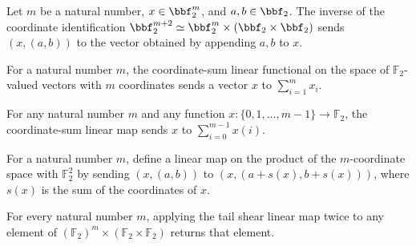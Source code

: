 \begin{theorem}
\label{FABL.splitLastTwoLinearEquiv_symm_apply}
\leanok
{}
Let $m$ be a natural number, $x\in\bbf_2^m$, and $a,b\in\bbf_2$. The inverse of the
coordinate identification $\bbf_2^{m+2}\simeq\bbf_2^m\times(\bbf_2\times\bbf_2)$ sends
$(x,(a,b))$ to the vector obtained by appending $a,b$ to $x$.
\end{theorem}

\begin{definition}
\label{FABL.coordinateSumLinearMap}
\leanok
{}
For a natural number $m$, the coordinate-sum linear functional on the space of
$\mathbb{F}_2$-valued vectors with $m$ coordinates sends a vector $x$ to
$\sum_{i=1}^{m}x_i$.
\end{definition}

\begin{theorem}
\label{FABL.coordinateSumLinearMap_apply}
\leanok
{}
For any natural number $m$ and any function $x : \{0,1,\ldots,m-1\} \to
\mathbb{F}_2$, the coordinate-sum linear map sends $x$ to $\sum_{i=0}^{m-1} x(i)$.
\end{theorem}

\begin{definition}
\label{FABL.tailShearLinearMap}
\leanok
{}
For a natural number $m$, define a linear map on the product of the $m$-coordinate space
with $\mathbb{F}_2^2$ by sending $(x,(a,b))$ to $(x,(a+s(x),b+s(x)))$, where $s(x)$ is
the sum of the coordinates of $x$.
\end{definition}

\begin{theorem}
\label{FABL.tailShearLinearMap_involutive}
\leanok
{}
For every natural number $m$, applying the tail shear linear map twice to any element of
$(\mathbb{F}_2)^m\times(\mathbb{F}_2\times\mathbb{F}_2)$ returns that element.
\end{theorem}


